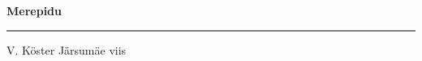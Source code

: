 \documentclass[10pt]{book}
\begin{document}
{
  \samepage
  \raggedbottom
  \raggedright
  \sloppy


  \vspace{0.2in}

  \noindent\begin{minipage}{.1\textwidth}
    \hfill\vspace{0.1in}
  \end{minipage}%
  \noindent\begin{minipage}{.8\textwidth}
    \centering
    \bfseries
    \large Merepidu
  \end{minipage}%
  \noindent\begin{minipage}{.1\textwidth}
      \hfill\vspace{0.1in}
  \end{minipage}

  \nopagebreak[4]
  \vspace{0.1in}
  \nopagebreak[4]
  \hrule height 0.05ex
  \nopagebreak[4]
  \vspace{-0.05in}

  {\footnotesize V. K\"oster \hfill J\"arsum\"ae viis }\\
  \vspace{0.01in}



}
\end{document}
